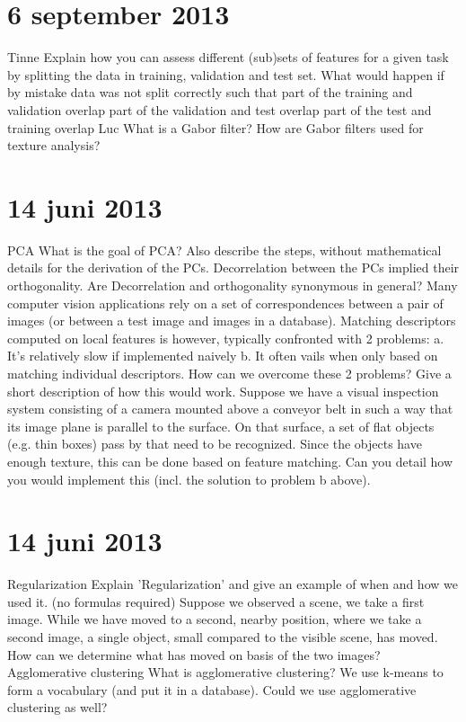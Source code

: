 \documentclass{article}
\begin{document}
\section*{6 september 2013}
\begin{quest}
Tinne
Explain how you can assess different (sub)sets of features for a given task by splitting the data in training, validation and test set.
What would happen if by mistake data was not split correctly such that
part of the training and validation overlap
part of the validation and test overlap
part of the test and training overlap
Luc
What is a Gabor filter?
How are Gabor filters used for texture analysis?
\end{quest}
\section*{14 juni 2013}
\begin{quest}
PCA
What is the goal of PCA? Also describe the steps, without mathematical details for the derivation of the PCs.
Decorrelation between the PCs implied their orthogonality. Are Decorrelation and orthogonality synonymous in general?
Many computer vision applications rely on a set of correspondences between a pair of images (or between a test image and images in a database). Matching descriptors computed on local features is however, typically confronted with 2 problems:
a. It's relatively slow if implemented naively
b. It often vails when only based on matching individual descriptors.
How can we overcome these 2 problems? Give a short description of how this would work.
Suppose we have a visual inspection system consisting of a camera mounted above a conveyor belt in such a way that its image plane is parallel to the surface. On that surface, a set of flat objects (e.g. thin boxes) pass by that need to be recognized. Since the objects have enough texture, this can be done based on feature matching. Can you detail how you would implement this (incl. the solution to problem b above).
\end{quest}
\section*{14 juni 2013}
\begin{quest}
Regularization
Explain 'Regularization' and give an example of when and how we used it. (no formulas required)
Suppose we observed a scene, we take a first image. While we have moved to a second, nearby position, where we take a second image, a single object, small compared to the visible scene, has moved. How can we determine what has moved on basis of the two images?
Agglomerative clustering
What is agglomerative clustering?
We use k-means to form a vocabulary (and put it in a database). Could we use agglomerative clustering as well?
\end{quest}
\end{document}
